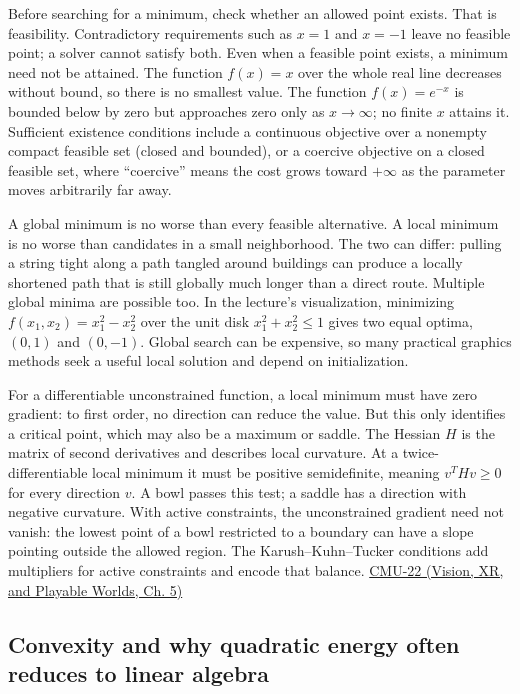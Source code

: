 Before searching for a minimum, check whether an allowed point exists. That is feasibility. Contradictory requirements such as \(x=1\) and \(x=-1\) leave no feasible point; a solver cannot satisfy both. Even when a feasible point exists, a minimum need not be attained. The function \(f(x)=x\) over the whole real line decreases without bound, so there is no smallest value. The function \(f(x)=e^{-x}\) is bounded below by zero but approaches zero only as \(x\to\infty\); no finite \(x\) attains it. Sufficient existence conditions include a continuous objective over a nonempty compact feasible set (closed and bounded), or a coercive objective on a closed feasible set, where ``coercive'' means the cost grows toward \(+\infty\) as the parameter moves arbitrarily far away.

A global minimum is no worse than every feasible alternative. A local minimum is no worse than candidates in a small neighborhood. The two can differ: pulling a string tight along a path tangled around buildings can produce a locally shortened path that is still globally much longer than a direct route. Multiple global minima are possible too. In the lecture's visualization, minimizing \(f(x_1,x_2)=x_1^2-x_2^2\) over the unit disk \(x_1^2+x_2^2\le1\) gives two equal optima, \((0,1)\) and \((0,-1)\). Global search can be expensive, so many practical graphics methods seek a useful local solution and depend on initialization.

For a differentiable unconstrained function, a local minimum must have zero gradient: to first order, no direction can reduce the value. But this only identifies a critical point, which may also be a maximum or saddle. The Hessian \(H\) is the matrix of second derivatives and describes local curvature. At a twice-differentiable local minimum it must be positive semidefinite, meaning \(v^T H v\ge0\) for every direction \(v\). A bowl passes this test; a saddle has a direction with negative curvature. With active constraints, the unconstrained gradient need not vanish: the lowest point of a bowl restricted to a boundary can have a slope pointing outside the allowed region. The Karush--Kuhn--Tucker conditions add multipliers for active constraints and encode that balance. \href{../07-Vision-XR-and-Playable-Worlds/main.pdf\#nameddest=04-visual-computing-ii-ch036-cmu-22---optimization}{CMU-22 (Vision, XR, and Playable Worlds, Ch. 5)}

\subsection{Convexity and why quadratic energy often reduces to linear algebra}\label{04-visual-computing-ii-ch029-convexity-and-why-quadratic-energy-often-reduces-to-linear-algebra}

